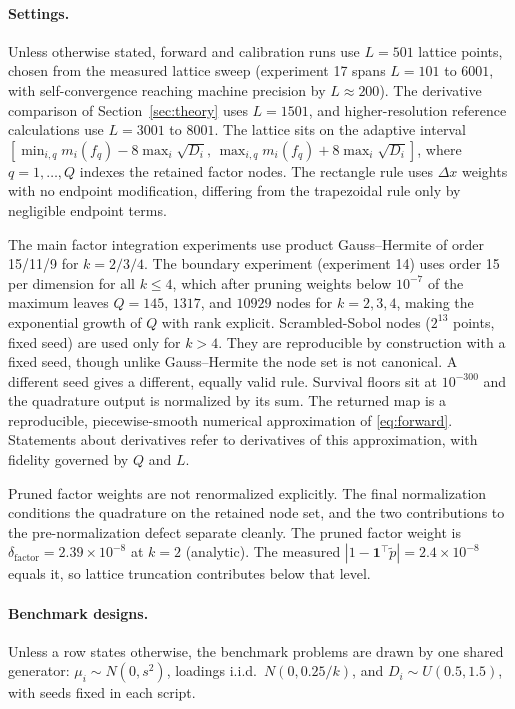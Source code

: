\documentclass[12pt]{article}
\theoremstyle{remark}
\begin{document}
\paragraph{Settings.} Unless otherwise stated, forward and
calibration runs use $L = 501$ lattice points, chosen from the measured
lattice sweep (experiment 17 spans $L = 101$ to $6001$, with
self-convergence reaching machine precision by $L \approx 200$). The
derivative comparison of Section~\ref{sec:theory} uses $L = 1501$,
and higher-resolution reference calculations use $L = 3001$ to $8001$. The lattice sits on
the adaptive interval
$[\min_{i,q} m_i(f_q) - 8\max_i\sqrt{D_i},\,
\max_{i,q} m_i(f_q) + 8\max_i\sqrt{D_i}]$, where $q = 1, \dots, Q$ indexes
the retained factor nodes. The rectangle rule uses $\Delta x$ weights
with no endpoint modification, differing from the trapezoidal rule only
by negligible endpoint terms.

The main factor integration experiments use product
Gauss--Hermite of order 15/11/9 for $k = 2/3/4$. The boundary experiment
(experiment 14) uses order 15 per dimension for all $k \le 4$, which after
pruning weights below $10^{-7}$ of the maximum leaves $Q = 145$, $1317$, and
$10929$ nodes for $k = 2, 3, 4$, making the exponential growth of $Q$
with rank explicit. Scrambled-Sobol nodes ($2^{13}$ points, fixed seed)
are used only for $k > 4$. They are reproducible by construction with a fixed seed, though
unlike Gauss--Hermite the node set is not canonical. A different seed
gives a different, equally valid rule. Survival floors sit at
$10^{-300}$ and the quadrature output is normalized by its sum. The
returned map is a reproducible, piecewise-smooth numerical approximation
of \eqref{eq:forward}. Statements about derivatives refer to
derivatives of this approximation, with fidelity governed by $Q$ and
$L$.

Pruned factor weights are not renormalized explicitly. The final
normalization conditions the quadrature on the retained node set, and the
two contributions to the pre-normalization defect separate cleanly. The
pruned factor weight is $\delta_{\mathrm{factor}} = 2.39\times10^{-8}$
at $k=2$ (analytic). The measured $|1 - \mathbf{1}^\top \tilde p| =
2.4\times10^{-8}$ equals it, so lattice truncation contributes below that
level.

\paragraph{Benchmark designs.} Unless a row states otherwise, the
benchmark problems are drawn by one shared generator: $\mu_i \sim
N(0, s^2)$, loadings i.i.d.\ $N(0, 0.25/k)$, and $D_i \sim
U(0.5, 1.5)$, with seeds fixed in each script.
\end{document}
